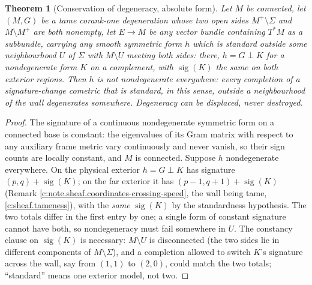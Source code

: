 \documentclass[11pt]{article}
\newtheorem{theorem}{Theorem}[section]
\theoremstyle{definition}
\theoremstyle{plain}
\providecommand{\Mp}{}\renewcommand{\Mp}{M^{+}}
\providecommand{\Sig}{}\renewcommand{\Sig}{\Sigma}
\begin{document}
\begin{theorem}[Conservation of degeneracy, absolute form]\label{c:sheaf.conservation-degeneracy-absolute-form}
Let $M$ be connected, let $(M,G)$ be a tame corank-one degeneration whose two open sides $\Mp \setminus \Sig$ and $M \setminus \Mp$ are both nonempty, let $E \to M$ be \emph{any} vector bundle containing $T^*M$ as a subbundle, carrying \emph{any} smooth symmetric form $h$ which is \emph{standard} outside some neighbourhood $U$ of $\Sig$ with $M \setminus U$ meeting both sides: there, $h = G \perp K$ for a nondegenerate form $K$ on a complement, with $\operatorname{sig}(K)$ the same on both exterior regions. Then $h$ is not nondegenerate everywhere: every completion of a signature-change cometric that is standard, in this sense, outside a neighbourhood of the wall degenerates somewhere. Degeneracy can be displaced, never destroyed.
\end{theorem}
\begin{proof}
The signature of a continuous nondegenerate symmetric form on a connected base is constant: the eigenvalues of its Gram matrix with respect to any auxiliary frame metric vary continuously and never vanish, so their sign counts are locally constant, and $M$ is connected. Suppose $h$ nondegenerate everywhere. On the physical exterior $h = G \perp K$ has signature $(p,q) + \operatorname{sig}(K)$; on the far exterior it has $(p{-}1, q{+}1) + \operatorname{sig}(K)$ (Remark \ref{c:note.sheaf.coordinates-crossing-speed}, the wall being tame, \ref{c:sheaf.tameness}), with the \emph{same} $\operatorname{sig}(K)$ by the standardness hypothesis. The two totals differ in the first entry by one; a single form of constant signature cannot have both, so nondegeneracy must fail somewhere in $U$. The constancy clause on $\operatorname{sig}(K)$ is necessary: $M \setminus U$ is disconnected (the two sides lie in different components of $M \setminus \Sig$), and a completion allowed to switch $K$'s signature across the wall, say from $(1,1)$ to $(2,0)$, could match the two totals; ``standard'' means one exterior model, not two.

\end{proof}
\end{document}
